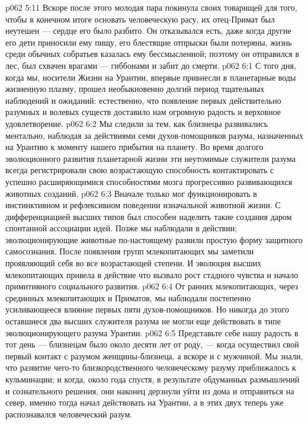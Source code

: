 \vs p062 5:11 Вскоре после этого молодая пара покинула своих товарищей для того, чтобы в конечном итоге основать человеческую расу, их отец\hyp{}Примат был неутешен --- сердце его было разбито. Он отказывался есть, даже когда другие его дети приносили ему пищу, его блестящие отпрыски были потеряны, жизнь среди обычных собратьев казалась ему бессмысленной; поэтому он отправился в лес, был схвачен врагами --- гиббонами и забит до смерти.
\vs p062 6:1 С того дня, когда мы, носители Жизни на Урантии, впервые привнесли в планетарные воды жизненную плазму, прошел необыкновенно долгий период тщательных наблюдений и ожиданий: естественно, что появление первых действительно разумных и волевых существ доставило нам огромную радость и верховное удовлетворение.
\vs p062 6:2 Мы следили за тем, как близнецы развивались ментально, наблюдая за действиями семи духов\hyp{}помощников разума, назначенных на Урантию к моменту нашего прибытия на планету. Во время долгого эволюционного развития планетарной жизни эти неутомимые служители разума всегда регистрировали свою возрастающую способность контактировать с успешно расширяющимися способностями мозга прогрессивно развивающихся животных созданий.
\vs p062 6:3 Вначале только  мог функционировать в инстинктивном и рефлексивном поведении изначальной животной жизни. С дифференциацией высших типов  был способен наделить такие создания даром спонтанной ассоциации идей. Позже мы наблюдали  в действии; эволюционирующие животные по\hyp{}настоящему развили простую форму защитного самосознания. После появления групп млекопитающих мы заметили  проявляющий себя во все возрастающей степени. И эволюция высших млекопитающих привела в действие  что вызвало рост стадного чувства и начало примитивного социального развития.
\vs p062 6:4 От ранних млекопитающих, через срединных млекопитающих и Приматов, мы наблюдали постепенно усиливающееся влияние первых пяти духов\hyp{}помощников. Но никогда до этого оставшиеся два высших служителя разума не могли еще действовать в типе эволюционирующего разума Урантии.
\vs p062 6:5 Представьте себе нашу радость в тот день --- близнецам было около десяти лет от роду, --- когда  осуществил свой первый контакт с разумом женщины\hyp{}близнеца, а вскоре и с мужчиной. Мы знали, что развитие чего\hyp{}то близкородственного человеческому разуму приближалось к кульминации; и когда, около года спустя, в результате обдуманных размышлений и сознательного решения, они наконец дерзнули уйти из дома и отправиться на север, именно тогда  начал действовать на Урантии, а в этих двух теперь уже распознавался человеческий разум.
